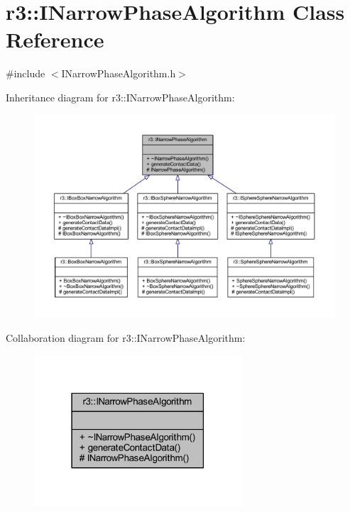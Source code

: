 \hypertarget{classr3_1_1_i_narrow_phase_algorithm}{}\section{r3\+:\+:I\+Narrow\+Phase\+Algorithm Class Reference}
\label{classr3_1_1_i_narrow_phase_algorithm}


{\ttfamily \#include $<$I\+Narrow\+Phase\+Algorithm.\+h$>$}



Inheritance diagram for r3\+:\+:I\+Narrow\+Phase\+Algorithm\+:\nopagebreak
\begin{figure}[H]
\begin{center}
\leavevmode
\includegraphics[width=350pt]{classr3_1_1_i_narrow_phase_algorithm__inherit__graph}
\end{center}
\end{figure}


Collaboration diagram for r3\+:\+:I\+Narrow\+Phase\+Algorithm\+:\nopagebreak
\begin{figure}[H]
\begin{center}
\leavevmode
\includegraphics[width=219pt]{classr3_1_1_i_narrow_phase_algorithm__coll__graph}
\end{center}
\end{figure}
